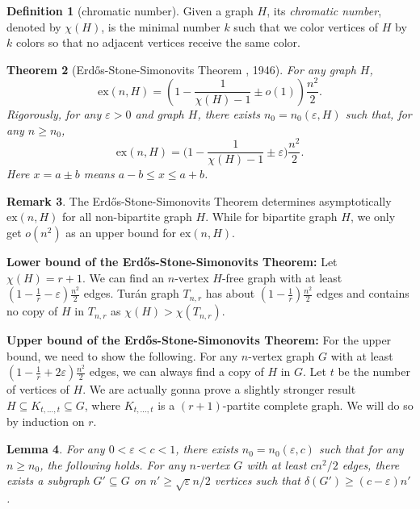 \documentclass{article}
\newtheorem{theorem}{Theorem}[section]
\newtheorem{lemma}[theorem]{Lemma}
\theoremstyle{definition}
\newtheorem{remark}[theorem]{Remark}
\newtheorem{definition}[theorem]{Definition}
\newcommand{\ex}{\mathrm{ex}}
\def\Erdos{Erd\H{o}s}
\def\Turan{Tur\'an}
\begin{document}
\begin{definition}[chromatic number]
    Given a graph $H$, its \emph{chromatic number}, denoted by $\chi(H)$, is the minimal number $k$ such that we color vertices of $H$ by $k$ colors so that no adjacent vertices receive the same color.
\end{definition}

\begin{theorem}[\Erdos{}-Stone-Simonovits Theorem \cite{erdos1966limit, erdos1946linear}, 1946]{}{} \label{ESS}
    For any graph $H$, 
    \[
    \ex(n,H) = \left(1- \frac{1}{\chi(H) - 1} \pm o(1) \right) \frac{n^2}{2}.
    \]
    Rigorously, for any $\varepsilon > 0$ and graph $H$, there exists $n_0 = n_0(\varepsilon,H)$ such that, for any $n \geq n_0$,
    \[
    \ex(n,H) = \Big(1-\frac{1}{\chi(H)-1} \pm \varepsilon \Big)\frac{n^2}{2}.
    \]
    Here $x = a \pm b$ means $a-b \leq x \leq a+b$.
\end{theorem}


\begin{remark}
    The \Erdos{}-Stone-Simonovits Theorem determines asymptotically $\ex(n,H)$ for all non-bipartite graph $H$. While for bipartite graph $H$, we only get $o(n^2)$ as  an upper bound for $\ex(n, H)$.
\end{remark}


\textbf{Lower bound of the \Erdos{}-Stone-Simonovits Theorem:} Let $\chi(H) = r+1$. We can find an $n$-vertex $H$-free graph with at least $(1 - \frac{1}{r} - \varepsilon)\frac{n^2}{2}$ edges. \Turan{} graph $T_{n,r}$ has about $(1 - \frac{1}{r})\frac{n^2}{2}$ edges and contains no copy of $H$ in $T_{n,r}$ as $\chi(H) > \chi(T_{n,r})$.


\textbf{Upper bound of the \Erdos{}-Stone-Simonovits Theorem:} For the upper bound, we need to show the following. For any $n$-vertex graph $G$ with at least $(1 - \frac{1}{r} + 2\varepsilon)\frac{n^2}{2}$ edges, we can always find a copy of $H$ in $G$. Let $t$ be the number of vertices of $H$. We are actually gonna prove a slightly stronger result $H \subseteq K_{t,..., t} \subseteq G$, where $K_{t,...,t}$ is a $(r+1)$-partite complete graph. We will do so by induction on $r$. 

\begin{lemma}\label{subgraphlem}
    For any $0 < \varepsilon < c <1$, there exists $n_0 = n_0(\varepsilon,c)$ such that for any $n \geq n_0$, the following holds. For any $n$-vertex $G$ with at least $cn^2/2$ edges, there exists a subgraph $G' \subseteq G$ on $n' \geq \sqrt{\varepsilon}n/2$ vertices such that $\delta(G') \geq (c-\varepsilon)n'$.
\end{lemma}
\end{document}
